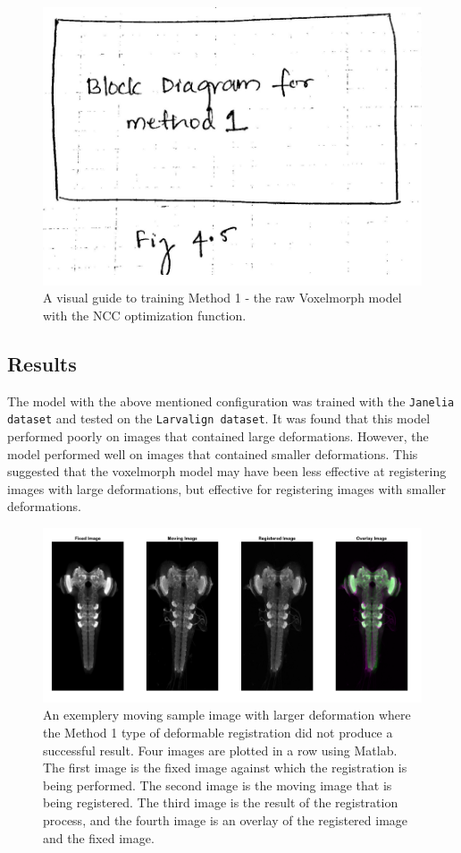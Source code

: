 \documentclass{report}
\begin{document}
	\begin{figure}[h!]
		\centering
		\includegraphics[width=0.6\columnwidth]{resources/chapter4/block_diagram_method_1.png}
		\caption{A visual guide to training Method 1 - the raw Voxelmorph model with the NCC optimization function.}
		\label{fig:block_method1}
	\end{figure}
	
	\subsection{Results}
	The model with the above mentioned configuration was trained with the \texttt{Janelia dataset} and tested on the \texttt{Larvalign dataset}. It was found that this model performed poorly on images that contained large deformations. However, the model performed well on images that contained smaller deformations. This suggested that the voxelmorph model may have been less effective at registering images with large deformations, but effective for registering images with smaller deformations.
	
	\begin{figure}[h!]
		\centering
		\includegraphics[width=0.9\columnwidth]{resources/chapter4/np_60H12_14E09_MB049B_020113B_scaled.tif.png}
		\caption{An exemplery moving sample image with larger deformation where the Method 1 type of deformable registration did not produce a successful result. Four images are plotted in a row using Matlab. The first image is the fixed image against which the registration is being performed. The second image is the moving image that is being registered. The third image is the result of the registration process, and the fourth image is an overlay of the registered image and the fixed image.}
		\label{fig:method1_fail}
	\end{figure}
\end{document}
